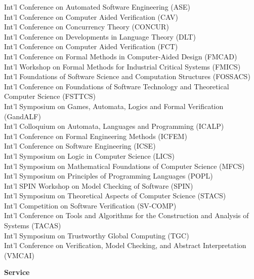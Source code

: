 \begin{resume}
   Int'l Conference on Automated Software Engineering (ASE)\\
   Int'l Conference on Computer Aided Verification (CAV)\\
   Int'l Conference on Concurrency Theory (CONCUR)\\
   Int'l Conference on Developments in Language Theory (DLT)\\
   Int'l Conference on Computer Aided Verification (FCT)\\
   Int'l Conference on Formal Methods in Computer-Aided Design (FMCAD)\\
   Int'l Workshop on Formal Methods for Industrial Critical Systems (FMICS)\\
   Int'l Foundations of Software Science and Computation Structures (FOSSACS)\\
   Int'l Conference on Foundations of Software Technology and Theoretical Computer Science (FSTTCS)\\
   Int'l Symposium on Games, Automata, Logics and Formal Verification (GandALF)\\
   Int'l Colloquium on Automata, Languages and Programming (ICALP)\\
   Int'l Conference on Formal Engineering Methods (ICFEM)\\
   Int'l Conference on Software Engineering (ICSE)\\
   Int'l Symposium on Logic in Computer Science (LICS)\\
   Int'l Symposium on Mathematical Foundations of Computer Science (MFCS)\\
   Int'l Symposium on Principles of Programming Languages (POPL)\\
   Int'l SPIN Workshop on Model Checking of Software (SPIN)\\   
   Int'l Symposium on Theoretical Aspects of Computer Science (STACS)\\
   Int'l Competition on Software Verification (SV-COMP)\\
   Int'l  Conference on Tools and Algorithms for the Construction and Analysis of Systems (TACAS)\\
   Int'l Symposium on Trustworthy Global Computing (TGC)\\
   Int'l Conference on Verification, Model Checking, and Abstract Interpretation (VMCAI)\\
\vspace{-0.3cm}

{\bf Service}\\
\vspace{-0.19cm}
\begin{list1}


\end{list1}
\end{resume}
